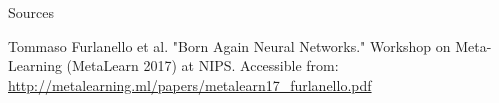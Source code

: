 \documentclass{beamer}
\begin{document}
\begin{frame}{Sources}

\begin{thebibliography}{0}

   Tommaso Furlanello et al. "Born Again Neural Networks." Workshop on Meta-Learning (MetaLearn 2017) at NIPS. Accessible from: \url{http://metalearning.ml/papers/metalearn17_furlanello.pdf}
  
  
\end{thebibliography}

\end{frame}
 
 
 
\end{document}
